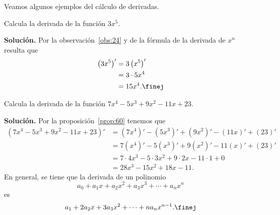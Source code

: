 \documentclass[12pt,a4paper]{book}
\begin{document}
    Veamos algunos ejemplos del cálculo de derivadas.

    \begin{ejemplo}\label{ejm:76}
        Calcula la derivada de la función $3x^{5}$.

        \textbf{Solución.} Por la observación~\ref{obs:24} y de la fórmula de la derivada de $x^{n}$
        resulta que
        \begin{align*}
            \left(3x^{5}\right)'&=3\left(x^{5}\right)'\\
            &=3\cdot 5x^{4}\\
            &=15x^{4}.\finej
        \end{align*}
    \end{ejemplo}

    \begin{ejemplo}\label{ejm:77}
        Calcula la derivada de la función $7x^{4}-5x^{3}+9x^{2}-11x+23$.

        \textbf{Solución.} Por la proposición~\ref{prop:60} tenemos que
        \begin{align*}
            \left(7x^{4}-5x^{3}+9x^{2}-11x+23\right)'&=\left(7x^{4}\right)'-\left(5x^{3}\right)'+\left(9x^{2}\right)'-(11x)'+(23)'\\
            &=7\left(x^{4}\right)'-5\left(x^{3}\right)'+9\left(x^{2}\right)'-11(x)'+(23)'\\
            &=7\cdot 4x^{3}-5\cdot 3x^{2}+9\cdot 2x-11\cdot 1+0\\
            &=28x^{3}-15x^{2}+18x-11.
        \end{align*}
        En general, se tiene que la derivada de un polinomio
        \begin{equation*}
            a_{0}+a_{1}x+a_{2}x^{2}+a_{3}x^{3}+\cdots+a_{n}x^{n}
        \end{equation*}
        es
        \begin{equation*}
            a_{1}+2a_{2}x+3a_{3}x^{2}+\cdots+na_{n}x^{n-1}.\finej
        \end{equation*}
    \end{ejemplo}
\end{document}

